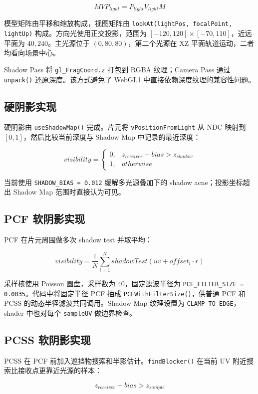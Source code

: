 \documentclass{sjtuarticle}
\begin{document}
\[
MVP_{light}=P_{light}V_{light}M
\]

模型矩阵由平移和缩放构成，视图矩阵由 \texttt{lookAt(lightPos, focalPoint, lightUp)} 构成。方向光使用正交投影，范围为 \([-120,120]\times[-70,110]\)，近远平面为 \(40,240\)。主光源位于 \((0,80,80)\)，第二个光源在 XZ 平面轨道运动，二者均看向场景中心。

Shadow Pass 将 \texttt{gl\_FragCoord.z} 打包到 RGBA 纹理；Camera Pass 通过 \texttt{unpack()} 还原深度。该方式避免了 WebGL1 中直接依赖深度纹理的兼容性问题。

\subsection{硬阴影实现}

硬阴影由 \texttt{useShadowMap()} 完成。片元将 \texttt{vPositionFromLight} 从 NDC 映射到 \([0,1]\)，然后比较当前深度与 Shadow Map 中记录的最近深度：

\[
visibility =
\begin{cases}
0, & z_{receiver}-bias > z_{shadow} \\
1, & otherwise
\end{cases}
\]

当前使用 \texttt{SHADOW\_BIAS = 0.012} 缓解多光源叠加下的 shadow acne；投影坐标超出 Shadow Map 范围时直接认为可见。

\subsection{PCF 软阴影实现}

PCF 在片元周围做多次 shadow test 并取平均：

\[
visibility = \frac{1}{N}\sum_{i=1}^{N} shadowTest(uv + offset_i \cdot r)
\]

采样核使用 Poisson 圆盘，采样数为 40，固定滤波半径为 \texttt{PCF\_FILTER\_SIZE = 0.0035}。代码中将固定半径 PCF 抽成 \texttt{PCFWithFilterSize()}，供普通 PCF 和 PCSS 的动态半径滤波共同调用。Shadow Map 纹理设置为 \texttt{CLAMP\_TO\_EDGE}，shader 中也对每个 \texttt{sampleUV} 做边界检查。

\subsection{PCSS 软阴影实现}

PCSS 在 PCF 前加入遮挡物搜索和半影估计。\texttt{findBlocker()} 在当前 UV 附近搜索比接收点更靠近光源的样本：

\[
z_{receiver} - bias > z_{sample}
\]
\end{document}
